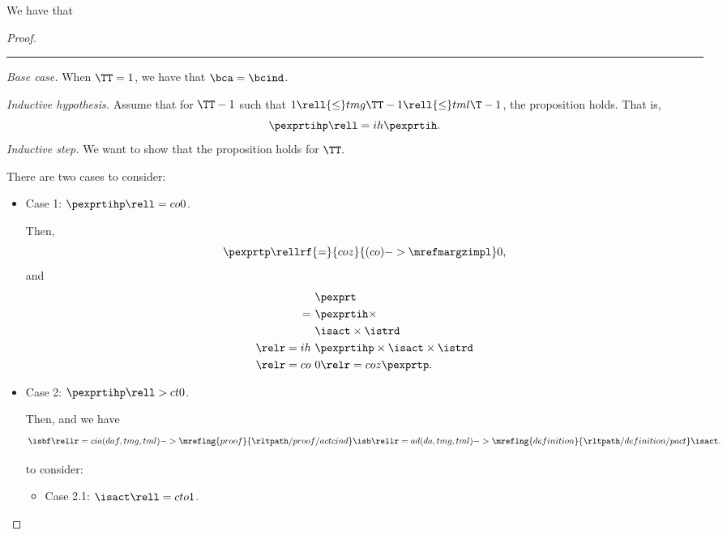 \begin{proposition}
  We have that %
\end{proposition}

\begin{proof}
  \hrule
  {\it Base case.}
  When $\TT = 1$,
  we have  that
  $\bca = \bcind$.

  \serule
  {\it Inductive hypothesis.}
  Assume that for $\TT - 1$ such that $1 \rell {\le} tmg \TT - 1 \rell {\le} tml \T - 1$,
  the proposition holds. That is,
  $$ \pexprtihp \rell = ih \pexprtih.$$%
  \srule
  {\it Inductive step.}
  We want to show that the proposition holds for $\TT.$

  There are two cases to consider:
  \begin{itemize}
    \item {} Case 1: $\pexprtihp \rell = co 0$. 

      Then,
      $$\pexprtp  \rellrf{=}{coz}{(co)->\mrefmargzimpl} 0,$$
      and
      \begin{align*}
        &\pexprt \\
        =\ &\pexprtih \times \\
        &\isact \times \istrd\\
        \relr = ih \ & \pexprtihp \times \isact \times \istrd \\
        \relr = co \ & 0 \relr = coz \pexprtp.
      \end{align*}
    \item {} Case 2: $\pexprtihp \rell > ct 0$. 

      Then, 
      and we have
      $$\isbf \rellr = cia (daf,tmg,tml)->\mreflng{proof}{\rltpath/proof/actcind} \isb 
      \rellr = ad (da,tmg,tml)->\mreflng{definition}{\rltpath/definition/pact} \isact.$$

       to consider:
      \begin{itemize}
        \item {} Case 2.1: $\isact \rell = cto 1$.


\end{itemize}
\end{itemize}
\end{proof}
